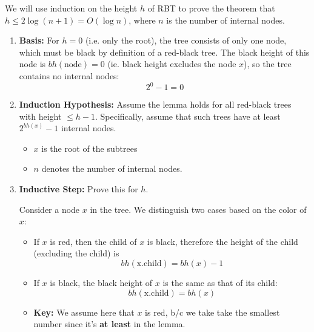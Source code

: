 \begin{derivation}
    We will use induction on the height \( h \) of RBT to prove the theorem that \( h \leq 2 \log(n+1) = O(\log n) \), where \( n \) is the number of internal nodes.
    \vspace{1em}

    \begin{enumerate}
        \item \textbf{Basis:} 
        For \( h = 0 \) (i.e. only the root), the tree consists of only one node, which must be black by definition of a red-black tree. The black height of this node is \( bh(\text{node}) = 0 \) (ie. black height excludes the node $x$), so the tree contains no internal nodes:
        \[
        2^0 - 1 = 0 
        \]
        \vspace{1em}

        \item \textbf{Induction Hypothesis:} 
        Assume the lemma holds for all red-black trees with height \( \leq h-1 \). Specifically, assume that such trees have at least \( 2^{bh(x)} - 1 \) internal nodes.
        \begin{itemize}
            \item \( x \) is the root of the subtrees
            \item \( n \) denotes the number of internal nodes.
        \end{itemize}

        \item \textbf{Inductive Step:} Prove this for $h$.
        \vspace{1em}

        Consider a node \( x \) in the tree. We distinguish two cases based on the color of \( x \):
        \begin{itemize}
            \item If \( x \) is red, then the child of $x$ is black, therefore the height of the child (excluding the child) is
            \[
            bh(\text{x.child}) = bh(x) - 1
            \]
            \item If \( x \) is black, the black height of \( x \) is the same as that of its child:
            \[
            bh(\text{x.child}) = bh(x)
            \]
        \end{itemize}

        \begin{itemize}
            \item \textbf{Key:} We assume here that \( x \) is red, b/c we take take the smallest number since it's \textbf{at least} in the lemma.
        \end{itemize}
        

\end{enumerate}
\end{derivation}
